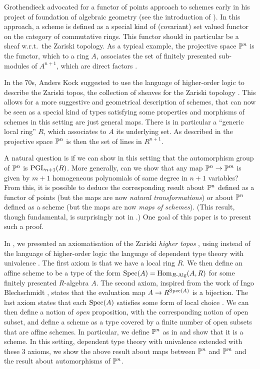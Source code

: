 Grothendieck advocated for a functor of points approach to schemes early in his
project of foundation of algebraic geometry (see the introduction of \cite{EGAI}).
In this approach, a scheme is defined as a special kind of (covariant) set valued functor
on the category of commutative rings. This functor should in particular
be a sheaf w.r.t.\ the Zariski topology. As a typical example, the projective space $\mathbb{P}^n$
is the functor, which to a ring $A$,
associates the set of finitely presented sub-modules of $A^{n+1}$, which are direct factors \cite{Demazure,Eisenbud,Jantzen}.

In the 70s, Anders Kock suggested to use the language of higher-order logic \cite{Church40}
to describe the Zariski topos, the collection of sheaves for the Zariski topology \cite{Kock74,kockreyes}.
This allows for
a more suggestive and geometrical description of schemes, that can now be seen as a special kind
of types satisfying some properties and morphisms of schemes in this setting are just general maps.
There is in particular a ``generic
local ring'' $R$, which associates to $A$ its underlying set. As described in \cite{kockreyes}
the projective space $\mathbb{P}^n$ is then the set of lines in $R^{n+1}$.

A natural question is if we can show in this setting that the automorphism group of $\mathbb{P}^n$
is  $\operatorname{PGL}_{n+1}(R)$.
More generally, can we show that any map $\mathbb{P}^n\rightarrow \mathbb{P}^m$ is given by $m+1$ homogeneous
polynomials of same degree in $n+1$ variables?
From this, it is possible to deduce the corresponding result about $\mathbb{P}^n$ defined as
a functor of points (but the maps are now {\em natural transformations}) or about $\mathbb{P}^n$ defined
as a scheme (but the maps are now {\em maps of schemes}).
(This result, though fundamental, is surprisingly not in \cite{Hartshorne}.)
One goal of this paper is to present such a proof.

In \cite{draft}, we presented an axiomatisation of the Zariski {\em higher topos} \cite{lurie-htt},
using instead of the language of higher-order logic the language of dependent type theory
with univalence \cite{hott}. The first axiom is that we have a local ring $R$. We then define
an affine scheme to be a type of the form $\operatorname{Spec}(A) = \mathrm{Hom}_{R\text{-}\mathrm{Alg}}(A,R)$ for some finitely presented
$R$-algebra $A$. The second axiom, inspired from the work of Ingo Blechschmidt \cite{ingo-thesis},
states that the evaluation map $A\rightarrow R^{\operatorname{Spec}(A)}$ is a bijection. The last axiom states
that each $\operatorname{Spec}(A)$ satisfies some form of local choice \cite{draft}. We can then define a notion
of {\em open} proposition, with the corresponding notion of open subset, and define a scheme as a type
covered by a finite number of open subsets that are affine schemes. In particular, we define
$\mathbb{P}^n$ as in \cite{kockreyes} and show that it is a scheme.
In this setting, dependent type theory with univalence extended with these 3 axioms,
we show the above result about maps between $\mathbb{P}^n$ and $\mathbb{P}^m$ and the result about automorphisms of $\mathbb{P}^n$.

